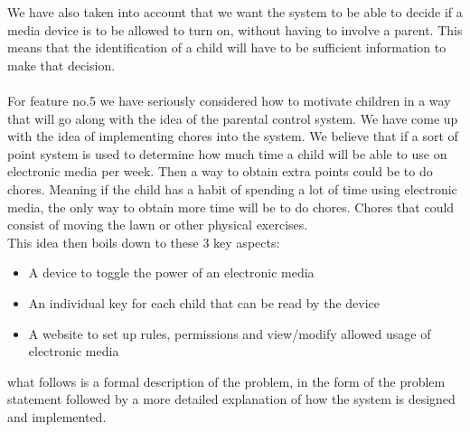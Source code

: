 We have also taken into account that we want the system to be able to decide if a media device is to be allowed to turn on, without having to involve a parent. This means that the identification of a child will have to be sufficient information to make that decision.\\
\\
For feature no.5 we have seriously considered how to motivate children in a way that will go along with the idea of the parental control system. We have come up with the idea of implementing chores into the system. We believe that if a sort of point system is used to determine how much time a child will be able to use on electronic media per week. Then a way to obtain extra points could be to do chores. Meaning if the child has a habit of spending a lot of time using electronic media, the only way to obtain more time will be to do chores. Chores that could consist of moving the lawn or other physical exercises.\\

This idea then boils down to these 3 key aspects:

\begin{itemize}
	\item A device to toggle the power of an electronic media
	\item An individual key for each child that can be read by the device
	\item A website to set up rules, permissions and view/modify allowed usage of electronic media
\end{itemize} 

what follows is a formal description of the problem, in the form of the problem statement followed by a more detailed explanation of how the system is designed and implemented.
